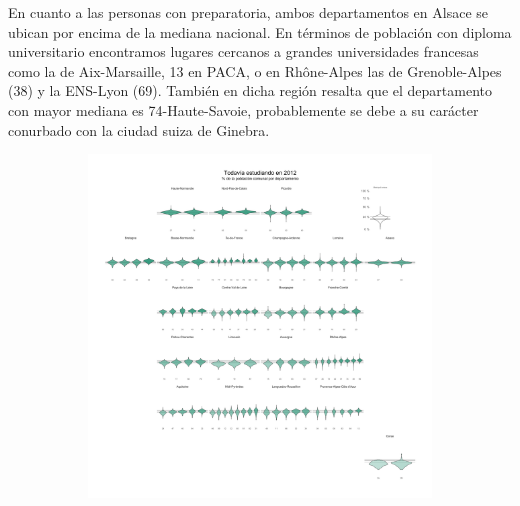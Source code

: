  En cuanto a las personas con preparatoria, ambos departamentos en Alsace se ubican por encima de la mediana nacional. En términos de población con diploma universitario encontramos lugares cercanos a grandes universidades francesas como la de Aix-Marsaille, 13 en PACA, o en Rhône-Alpes las de Grenoble-Alpes (38) y la ENS-Lyon (69). También en dicha región resalta que el departamento con mayor mediana es 74-Haute-Savoie, probablemente se debe a su carácter conurbado con la ciudad suiza de Ginebra.\\
 
\begin{figure}[h]
	\centering
	\begin{subfigure}{0.3\textwidth}
	\includegraphics[width = \textwidth]{Figs/AED/Geofacet_Distr_por_Dpto_Esc_2012}
	\end{subfigure}
	~
	\begin{subfigure}{0.3\textwidth}

\end{subfigure}
\end{figure}
